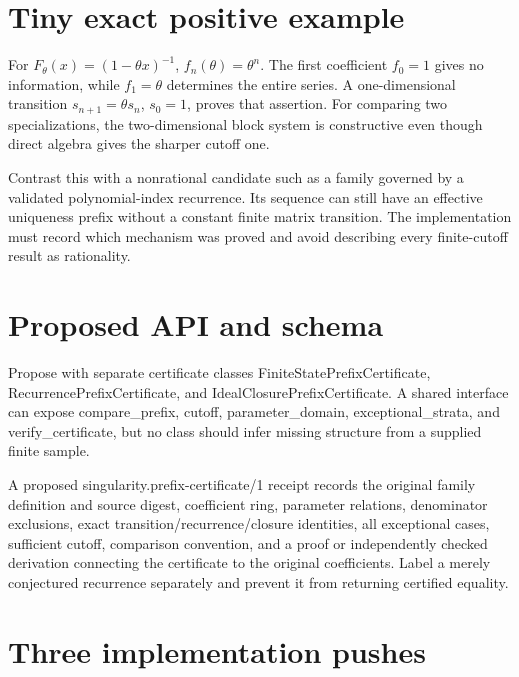 \documentclass[
  11pt,
  a4paper,
]{report}
\let\nxtexttt\texttt
\renewcommand{\texttt}[1]{\nxtexttt{\seqsplit{#1}}}
\begin{document}
\hypertarget{tiny-exact-positive-example}{%
\section{Tiny exact positive
example}\label{tiny-exact-positive-example}}

For \(F_\theta(x)=(1-\theta x)^{-1}\), \(f_n(\theta)=\theta^n\). The
first coefficient \(f_0=1\) gives no information, while \(f_1=\theta\)
determines the entire series. A one-dimensional transition
\(s_{n+1}=\theta s_n\), \(s_0=1\), proves that assertion. For comparing
two specializations, the two-dimensional block system is constructive
even though direct algebra gives the sharper cutoff one.

Contrast this with a nonrational candidate such as a family governed by
a validated polynomial-index recurrence. Its sequence can still have an
effective uniqueness prefix without a constant finite matrix transition.
The implementation must record which mechanism was proved and avoid
describing every finite-cutoff result as rationality.

\hypertarget{proposed-api-and-schema-1}{%
\section{Proposed API and schema}\label{proposed-api-and-schema-1}}

Propose \texttt{src/singularity/prefix\_certificates.py} with separate
certificate classes FiniteStatePrefixCertificate,
RecurrencePrefixCertificate, and IdealClosurePrefixCertificate. A shared
interface can expose compare\_prefix, cutoff, parameter\_domain,
exceptional\_strata, and verify\_certificate, but no class should infer
missing structure from a supplied finite sample.

A proposed singularity.prefix-certificate/1 receipt records the original
family definition and source digest, coefficient ring, parameter
relations, denominator exclusions, exact transition/recurrence/closure
identities, all exceptional cases, sufficient cutoff, comparison
convention, and a proof or independently checked derivation connecting
the certificate to the original coefficients. Label a merely conjectured
recurrence separately and prevent it from returning certified equality.

\hypertarget{three-implementation-pushes-5}{%
\section{Three implementation
pushes}\label{three-implementation-pushes-5}}
\end{document}
